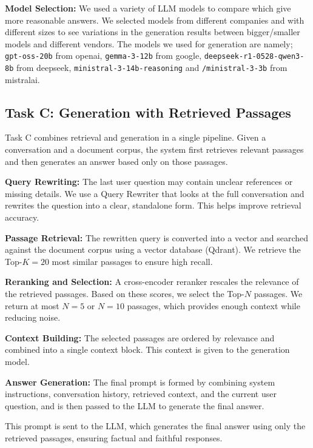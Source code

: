 \documentclass[11pt]{article}
\begin{document}
\textbf{Model Selection:} We used a variety of LLM models to compare which give more reasonable answers. We selected models from different companies and with different sizes to see variations in the generation results between bigger/smaller models and different vendors. The models we used for generation are namely; \texttt{gpt-oss-20b} from openai, \texttt{gemma-3-12b} from google,
 \texttt{deepseek-r1-0528-qwen3-8b} from deepseek, \texttt{ministral-3-14b-reasoning} and \texttt{/ministral-3-3b} from mistralai.

\subsection{Task C: Generation with Retrieved Passages}

Task C combines retrieval and generation in a single pipeline. Given a conversation and a document corpus, the system first retrieves relevant passages and then generates an answer based only on those passages.

\textbf{Query Rewriting:} The last user question may contain unclear references or missing details. We use a Query Rewriter that looks at the full conversation and rewrites the question into a clear, standalone form. This helps improve retrieval accuracy.

\textbf{Passage Retrieval:} The rewritten query is converted into a vector and searched against the document corpus using a vector database (Qdrant). We retrieve the Top-$K=20$ most similar passages to ensure high recall.

\textbf{Reranking and Selection:} A cross-encoder reranker rescales the relevance of the retrieved passages. Based on these scores, we select the Top-$N$ passages. We return at most $N=5$ or $N=10$ passages, which provides enough context while reducing noise.

\textbf{Context Building:} The selected passages are ordered by relevance and combined into a single context block. This context is given to the generation model.

\textbf{Answer Generation:} The final prompt is formed by combining system instructions, conversation history, retrieved context, and the current user question, and is then passed to the LLM to generate the final answer.



This prompt is sent to the LLM, which generates the final answer using only the retrieved passages, ensuring factual and faithful responses.
\end{document}
